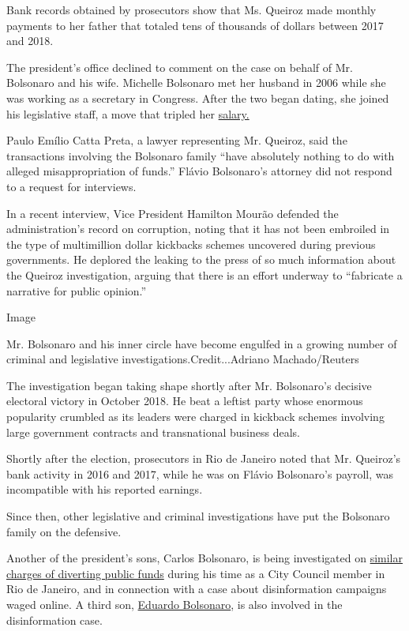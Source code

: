 Bank records obtained by prosecutors show that Ms. Queiroz made monthly
payments to her father that totaled tens of thousands of dollars between
2017 and 2018.

The president's office declined to comment on the case on behalf of Mr.
Bolsonaro and his wife. Michelle Bolsonaro met her husband in 2006 while
she was working as a secretary in Congress. After the two began dating,
she joined his legislative staff, a move that tripled her
\href{https://www1.folha.uol.com.br/poder/2017/12/1941623-bolsonaro-empregou-e-promoveu-a-mulher-em-gabinete-na-camara.shtml}{salary.}

Paulo Emílio Catta Preta, a lawyer representing Mr. Queiroz, said the
transactions involving the Bolsonaro family ``have absolutely nothing to
do with alleged misappropriation of funds.'' Flávio Bolsonaro's attorney
did not respond to a request for interviews.

In a recent interview, Vice President Hamilton Mourão defended the
administration's record on corruption, noting that it has not been
embroiled in the type of multimillion dollar kickbacks schemes uncovered
during previous governments. He deplored the leaking to the press of so
much information about the Queiroz investigation, arguing that there is
an effort underway to ``fabricate a narrative for public opinion.''

Image

Mr. Bolsonaro and his inner circle have become engulfed in a growing
number of criminal and legislative investigations.Credit...Adriano
Machado/Reuters

The investigation began taking shape shortly after Mr. Bolsonaro's
decisive electoral victory in October 2018. He beat a leftist party
whose enormous popularity crumbled as its leaders were charged in
kickback schemes involving large government contracts and transnational
business deals.

Shortly after the election, prosecutors in Rio de Janeiro noted that Mr.
Queiroz's bank activity in 2016 and 2017, while he was on Flávio
Bolsonaro's payroll, was incompatible with his reported earnings.

Since then, other legislative and criminal investigations have put the
Bolsonaro family on the defensive.

Another of the president's sons, Carlos Bolsonaro, is being investigated
on
\href{https://www1.folha.uol.com.br/poder/2020/07/quebra-de-sigilo-da-rachadinha-atinge-ex-assessores-de-carlos-bolsonaro-agora-sem-foro.shtml}{similar
charges of diverting public funds} during his time as a City Council
member in Rio de Janeiro, and in connection with a case about
disinformation campaigns waged online. A third son,
\href{https://politica.estadao.com.br/blogs/fausto-macedo/relembre-as-investigacoes-que-envolvem-flavio-carlos-e-eduardo-bolsonaro/}{Eduardo
Bolsonaro}, is also involved in the disinformation case.

